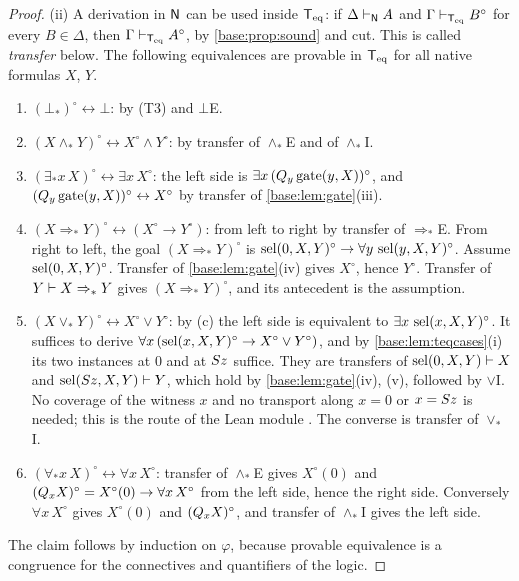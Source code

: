 \begin{proof}
(ii) A derivation in $\mathsf{N}$ can be used inside $\mathsf{T}_{\mathrm{eq}}$: if
$\Delta\vdash_{\mathsf{N}}A$ and $\Gamma\vdash_{\mathsf{T}_{\mathrm{eq}}}B^\circ$ for every
$B\in\Delta$, then $\Gamma\vdash_{\mathsf{T}_{\mathrm{eq}}}A^\circ$, by
\cref{base:prop:sound} and cut.  This is called \emph{transfer} below.  The
following equivalences are provable in $\mathsf{T}_{\mathrm{eq}}$ for all native formulas $X$,
$Y$.
\begin{enumerate}[label=\textup{(\alph*)}]
\item $(\bot_*)^\circ\leftrightarrow\bot$: by (T3) and $\bot$E.
\item $(X\wedge_* Y)^\circ\leftrightarrow X^\circ\wedge Y^\circ$: by transfer
 of $\wedge_*$E and of $\wedge_*$I.
\item $(\exists_* x\,X)^\circ\leftrightarrow\exists x\,X^\circ$: the left
 side is $\exists x\,(Q_{y}\operatorname{gate}(y,X))^\circ$, and
 $(Q_{y}\operatorname{gate}(y,X))^\circ\leftrightarrow X^\circ$ by transfer
 of \cref{base:lem:gate}(iii).
\item $(X\Rightarrow_* Y)^\circ\leftrightarrow(X^\circ\to Y^\circ)$: from
 left to right by transfer of $\Rightarrow_*$E.  From right to left, the
 goal $(X\Rightarrow_* Y)^\circ$ is
 $\operatorname{sel}(0,X,Y)^\circ\to\forall y\,\operatorname{sel}(y,X,Y)^\circ$.  Assume
 $\operatorname{sel}(0,X,Y)^\circ$.  Transfer of \cref{base:lem:gate}(iv) gives
 $X^\circ$, hence $Y^\circ$.  Transfer of $Y\vdash X\Rightarrow_* Y$ gives
 $(X\Rightarrow_* Y)^\circ$, and its antecedent is the assumption.
\item $(X\vee_* Y)^\circ\leftrightarrow X^\circ\vee Y^\circ$: by (c) the left
 side is equivalent to $\exists x\,\operatorname{sel}(x,X,Y)^\circ$.  It suffices to
 derive $\forall x\,(\operatorname{sel}(x,X,Y)^\circ\to X^\circ\vee Y^\circ)$, and by
 \cref{base:lem:teqcases}(i) its two instances at $0$ and at $S z$
 suffice.  They are transfers of $\operatorname{sel}(0,X,Y)\vdash X$ and
 $\operatorname{sel}(S z,X,Y)\vdash Y$, which hold by \cref{base:lem:gate}(iv), (v),
 followed by $\vee$I.  No coverage of the witness $x$ and no transport along
 $x=0$ or $x=S z$ is needed; this is the route of the Lean module
 .  The converse is transfer of $\vee_*$I.
\item $(\forall_* x\,X)^\circ\leftrightarrow\forall x\,X^\circ$: transfer of
 $\wedge_*$E gives $X^\circ(0)$ and
 $(Q_{x}X)^\circ=X^\circ(0)\to\forall x\,X^\circ$ from the left side, hence
 the right side.  Conversely $\forall x\,X^\circ$ gives $X^\circ(0)$ and
 $(Q_{x}X)^\circ$, and transfer of $\wedge_*$I gives the left side.
\end{enumerate}
The claim follows by induction on $\varphi$, because provable equivalence is
a congruence for the connectives and quantifiers of the logic.
\end{proof}

